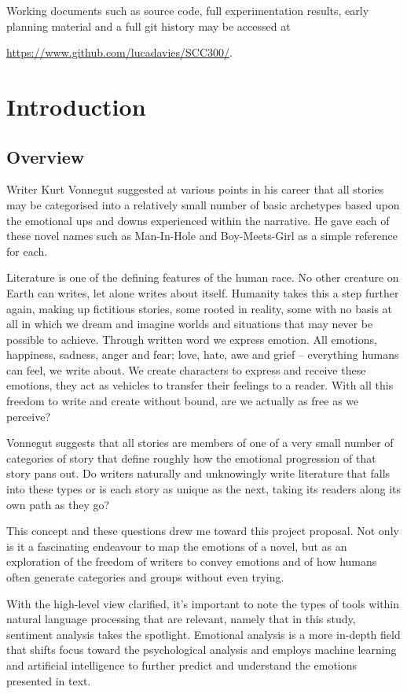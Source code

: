 \documentclass{article}
\begin{document}
    Working documents such as source code, full experimentation results, early planning material and a full git history may be accessed at {\url{https://www.github.com/lucadavies/SCC300/}.
\newpage
\tableofcontents
\newpage
\section{Introduction}
    \subsection{Overview}
        Writer Kurt Vonnegut suggested at various points in his career that all stories may be categorised into a relatively small number of basic archetypes based upon the emotional ups and downs experienced within the narrative. He gave each of these novel names such as Man-In-Hole and Boy-Meets-Girl as a simple reference for each. \citep{vonnegutLecture}

        Literature is one of the defining features of the human race. No other creature on Earth can writes, let alone writes about itself. Humanity takes this a step further again, making up fictitious stories, some rooted in reality, some with no basis at all in which we dream and imagine worlds and situations that may never be possible to achieve. Through written word we express emotion. All emotions, happiness, sadness, anger and fear; love, hate, awe and grief – everything humans can feel, we write about. We create characters to express and receive these emotions, they act as vehicles to transfer their feelings to a reader. With all this freedom to write and create without bound, are we actually as free as we perceive?

        Vonnegut suggests that all stories are members of one of a very small number of categories of story that define roughly how the emotional progression of that story pans out. Do writers naturally and unknowingly write literature that falls into these types or is each story as unique as the next, taking its readers along its own path as they go?

        This concept and these questions drew me toward this project proposal. Not only is it a fascinating endeavour to map the emotions of a novel, but as an exploration of the freedom of writers to convey emotions and of how humans often generate categories and groups without even trying.

        With the high-level view clarified, it's important to note the types of tools within natural language processing that are relevant, namely that in this study, sentiment analysis takes the spotlight. Emotional analysis is a more in-depth field that shifts focus toward the psychological analysis \citep{sentimentVsEmotionAnalysis} and employs machine learning and artificial intelligence to further predict and understand the emotions presented in text.
        
}
\end{document}
